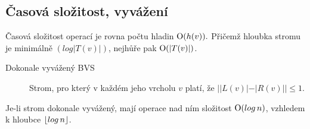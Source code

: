   \subsection{Časová složitost, vyvážení}
  Časová složitost operací je rovna počtu hladin $\textrm O(h(v)).$ Přičemž hloubka stromu je minimálně $(log|T(v)|)$,
  nejhůře pak $\textrm O(|T(v)|)$.

  \begin{description}
    \item[Dokonale vyvážený BVS] Strom, pro který v každém jeho vrcholu $v$ platí, že $||L(v)| - |R(v)|| \leq 1$.
  \end{description}

  Je-li strom dokonale vyvážený, mají operace nad ním složitost $\textrm O(log \, n)$, vzhledem k hloubce $\lfloor log \, n\rfloor$.
